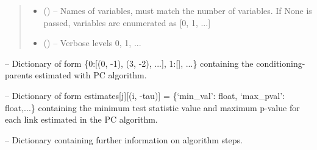 \documentclass[letterpaper,10pt,english]{sphinxmanual}
\begin{document}
\begin{fulllineitems}
\begin{quote}
\begin{description}
\begin{itemize}
\item {} 
 (\sphinxstyleliteralemphasis{, }\sphinxstyleliteralemphasis{ (}\sphinxstyleliteralemphasis{)}\sphinxstyleliteralemphasis{}\sphinxstyleliteralemphasis{)}\sphinxstyleliteralemphasis{}) -- Names of variables, must match the number of variables. If None is
passed, variables are enumerated as {[}0, 1, ...{]}

\item {} 
 (\sphinxstyleliteralemphasis{, }\sphinxstyleliteralemphasis{ (}\sphinxstyleliteralemphasis{)}\sphinxstyleliteralemphasis{}) -- Verbose levels 0, 1, ...

\end{itemize}

\end{description}\end{quote}

\begin{fulllineitems}
\label{\detokenize{index:PCMCI.all_parents}}
 -- Dictionary of form \{0:{[}(0, -1), (3, -2), ...{]}, 1:{[}{]}, ...\} containing the
conditioning-parents estimated with PC algorithm.

\end{fulllineitems}


\begin{fulllineitems}
\label{\detokenize{index:PCMCI.estimates}}
 -- Dictionary of form estimates{[}j{]}{[}(i, -tau){]} = \{`min\_val': float,
`max\_pval': float,...\} containing the  minimum test statistic value and
maximum p-value for each link estimated in the PC algorithm.

\end{fulllineitems}


\begin{fulllineitems}
\label{\detokenize{index:PCMCI.iterations}}
 -- Dictionary containing further information on algorithm steps.


\end{fulllineitems}
\end{fulllineitems}
\end{document}
